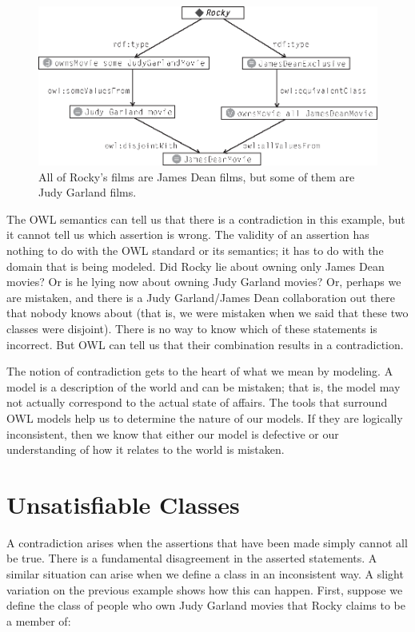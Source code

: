 \begin{figure}
\centering
\includegraphics[width=5in]{media/ch13/f13-07.eps}
\caption{All of Rocky's films are James Dean films, but some of them are Judy
Garland films.
}
\label{fig:ch13.07}
\end{figure}



The OWL semantics can tell us that there is a contradiction in this
example, but it cannot tell us which assertion is wrong. The validity of
an assertion has nothing to do with the OWL standard or its semantics;
it has to do with the domain that is being modeled. Did Rocky lie about
owning only James Dean movies? Or is he lying now about owning Judy
Garland movies? Or, perhaps we are mistaken, and there is a Judy
Garland/James Dean collaboration out there that nobody knows about (that
is, we were mistaken when we said that these two classes were disjoint).
There is no way to know which of these statements is incorrect. But OWL
can tell us that their combination results in a contradiction.

The notion of contradiction gets to the heart of what we mean by
modeling. A model is a description of the world and can be mistaken;
that is, the model may not actually correspond to the actual state of
affairs. The tools that surround OWL models help us to determine the
nature of our models. If they are logically inconsistent, then we know
that either our model is defective or our understanding of how it
relates to the world is mistaken.

\section{Unsatisfiable Classes}

A contradiction arises when the assertions that have been made simply
cannot all be true. There is a fundamental disagreement in the asserted
statements. A similar situation can arise when we define a class in an
inconsistent way. A slight variation on the previous example shows how
this can happen. First, suppose we define the class of people who own
Judy Garland movies that Rocky claims to be a member of:

